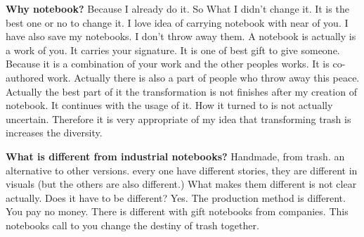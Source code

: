 
\textbf{Why notebook?} Because I already do it. So What I didn't change it. It is the best one or no to change it. I love idea of carrying notebook with near of you. I have also save my notebooks. I don't throw away them. A notebook is actually is a work of you. It carries your signature. It is one of best gift to give someone. Because it is a combination of your work and the other peoples works. It is co-authored work. Actually there is also a part of people who throw away this peace. Actually the best part of it the transformation is not finishes after my creation of notebook. It continues with the usage of it. How it turned to is not actually uncertain. Therefore it is very appropriate of my idea that transforming trash is increases the diversity.

\textbf{What is different from industrial notebooks?} Handmade, from trash. an alternative to other versions. every one have different stories, they are different in visuals (but the others are also different.) What makes them different is not clear actually. Does it have to be different? Yes. The production method is different. You pay no money. There is different with gift notebooks from companies. This notebooks call to you change the destiny of trash together. 

